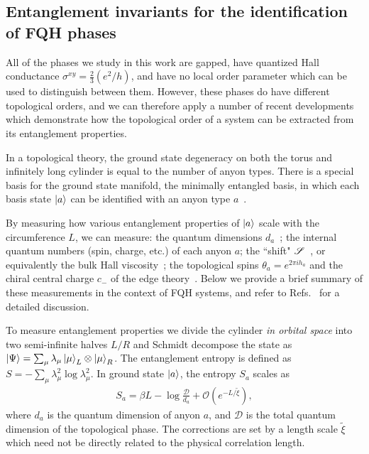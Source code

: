 \subsection{Entanglement invariants for the identification of FQH phases}
\label{sec:ent_sig}

All of the phases we study in this work are gapped,  have quantized Hall conductance $\sigma^{xy} = \frac23 (e^2/h)$, and  have no local order parameter which can be used to distinguish between them.
However, these phases do have different topological orders, and we can therefore apply a number of recent developments~\cite{Zhang2012,Cincio2013,ZaletelQHdmrg13,HHTuMomPol13} which demonstrate how the topological order of a system can be extracted from its entanglement properties.

In a topological theory, the ground state degeneracy on both the torus and infinitely long cylinder is equal to the number of anyon types.
There is a special basis for the ground state manifold, the minimally entangled basis, in which each basis state $\ket{a}$ can be identified with an anyon type $a$~\cite{KitaevPreskill, LiHaldane, Zhang2012}.

By measuring how various entanglement properties of $\ket{a}$ scale with the circumference $L$, we can measure:
	the quantum dimensions $d_a$~\cite{KitaevPreskill,LevinWen};
	the internal quantum numbers (spin, charge, etc.) of each anyon $a$;
	the ``shift" $\mathscr{S}$~\cite{wenzee}, or equivalently the bulk Hall viscosity~\cite{ZaletelQHdmrg13};
	the topological spins $\theta_a = e^{2 \pi i h_a}$ and the chiral central charge $c_-$ of the edge theory~\cite{Zhang2012, ZaletelQHdmrg13, HHTuMomPol13}.
Below we provide a brief summary of these measurements in the context of FQH systems, and refer to Refs.~\cite{ZaletelMixing} for a detailed discussion. 

To measure entanglement properties we divide the cylinder \emph{in orbital space} into two semi-infinite halves $L/R$ and Schmidt decompose the state as $ \ket{\Psi} = \sum_\mu \lambda_\mu \ket{\mu}_{ L} \otimes \ket{\mu}_{ R}$.
The entanglement entropy is defined as $S= - \sum_\mu \lambda_\mu^2 \log \lambda_\mu^2$.
In ground state $\ket{a}$, the entropy $S_a$ scales as \cite{KitaevPreskill,LevinWen} 
\begin{align}
	S_a = \beta L - \log\frac{\mathcal{D}}{d_a} + \mathcal{O}(e^{-L / \tilde{\xi}}),
	\label{eq:TEE}
\end{align}
where $d_a$ is the quantum dimension of anyon $a$, and $\mathcal{D}$ is the total quantum dimension of the topological phase.
The corrections are set by a length scale $\tilde{\xi}$ which need not be directly related to the physical correlation length.

